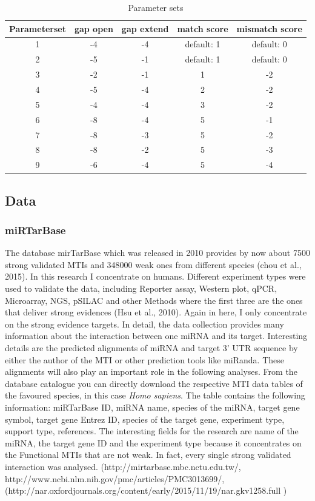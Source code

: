 \documentclass[12pt]{article}
\begin{document}
\begin{table}
\label{table:parameter}
\caption{Parameter sets}
\vspace{0.3cm}
\begin{tabular}{c|c|c|c|c}
Parameterset & gap open & gap extend & match score & mismatch score\\
\hline\hline 
1 & -4 & -4 & default: 1 & default: 0\\
2 & -5 & -1 & default: 1 & default: 0\\
3 & -2 & -1 & 1 & -2 \\
4 & -5 & -4 & 2 & -2 \\
5 & -4 & -4 & 3 & -2 \\
6 & -8 & -4 & 5 & -1 \\
7 & -8 & -3 & 5 & -2 \\
8 & -8 & -2 & 5 & -3 \\
9 & -6 & -4 & 5 & -4 \\
\hline
\end{tabular}
\end{table}

 
\subsection{Data} 
\subsubsection{miRTarBase}
The database mirTarBase which was released in 2010 provides by now about 7500 strong validated MTIs and 348000 weak ones from different species (chou et al., 2015). In this research I concentrate on humans. Different experiment types were used to validate the data, including Reporter assay, Western plot, qPCR, Microarray, NGS, pSILAC and other Methods where the first three are the ones that deliver strong evidences (Hsu et al., 2010). Again in here, I only concentrate on the strong evidence targets. In detail, the data collection provides many information about the interaction between one miRNA and its target. Interesting details are the predicted alignments of miRNA and target 3' UTR sequence by either the author of the MTI or other prediction tools like miRanda. These alignments will also play an important role in the following analyses. From the database catalogue you can directly download the respective MTI data tables of the favoured species, in this case \textit{Homo sapiens}. The table contains the following information: miRTarBase ID, miRNA name, species of the miRNA, target gene symbol, target gene Entrez ID, species of the target gene, experiment type, support type, references. The interesting fields for the research are name of the miRNA, the target gene ID and the experiment type because it concentrates on the Functional MTIs that are not weak. In fact, every single strong validated interaction was analysed. (http://mirtarbase.mbc.nctu.edu.tw/, http://www.ncbi.nlm.nih.gov/pmc/articles/PMC3013699/, (http://nar.oxfordjournals.org/content/early/2015/11/19/nar.gkv1258.full )
\end{document}
